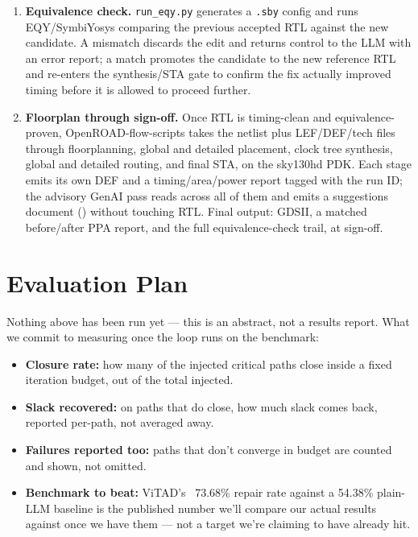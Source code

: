 \documentclass[11pt]{article}
\begin{document}
\begin{enumerate}[leftmargin=1.4em, itemsep=4pt]
\item \textbf{Equivalence check.} \texttt{run\_eqy.py} generates a
\texttt{.sby} config and runs EQY/SymbiYosys comparing the previous accepted
RTL against the new candidate. A mismatch discards the edit and returns
control to the LLM with an error report; a match promotes the candidate to
the new reference RTL and re-enters the synthesis/STA gate to confirm the
fix actually improved timing before it is allowed to proceed further.

\item \textbf{Floorplan through sign-off.} Once RTL is timing-clean and
equivalence-proven, OpenROAD-flow-scripts takes the netlist plus LEF/DEF/tech
files through floorplanning, global and detailed placement, clock tree
synthesis, global and detailed routing, and final STA, on the sky130hd PDK.
Each stage emits its own DEF and a timing/area/power report tagged with the
run ID; the advisory GenAI pass reads across all of them and emits a
suggestions document () without
touching RTL. Final output: GDSII, a matched before/after PPA report, and
the full equivalence-check trail, at sign-off.

\end{enumerate}

\section*{Evaluation Plan}

Nothing above has been run yet --- this is an abstract, not a results report.
What we commit to measuring once the loop runs on the benchmark:

\begin{itemize}[leftmargin=1.4em, itemsep=2pt]
\item \textbf{Closure rate:} how many of the injected critical paths close
inside a fixed iteration budget, out of the total injected.
\item \textbf{Slack recovered:} on paths that do close, how much slack comes
back, reported per-path, not averaged away.
\item \textbf{Failures reported too:} paths that don't converge in budget are
counted and shown, not omitted.
\item \textbf{Benchmark to beat:} ViTAD's~\cite{vitad} 73.68\% repair rate
against a 54.38\% plain-LLM baseline is the published number we'll compare
our actual results against once we have them --- not a target we're claiming
to have already hit.
\end{itemize}
\end{document}
